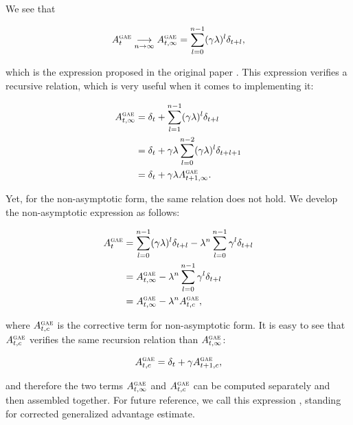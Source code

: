 We see that 

\begin{equation}
	A^{\textsc{gae}}_t \underset{n \rightarrow \infty}{\longrightarrow} A^{\textsc{gae}}_{t, \infty} = \sum_{l=0}^{n-1} (\gamma \lambda)^l \delta_{t+l},
\end{equation}

which is the expression proposed in the original paper \cite{gae}. This expression verifies a recursive relation, which is very useful when it comes to implementing it:

\begin{equation}
\begin{aligned}
	A^{\textsc{gae}}_{t, \infty} 	&= \delta_t + \sum_{l=1}^{n-1} (\gamma \lambda)^l \delta_{t+l}\\
					&= \delta_t + \gamma \lambda \sum_{l=0}^{n-2} (\gamma \lambda)^l \delta_{t+l+1}\\
					&= \delta_t + \gamma \lambda A^{\textsc{gae}}_{t+1, \infty}.
\end{aligned}
\end{equation}

Yet, for the non-asymptotic form, the same relation does not hold. We develop the non-asymptotic expression as follows:

\begin{equation}
\begin{aligned}
	A^{\textsc{gae}}_t 	&= \sum_{l=0}^{n-1} (\gamma \lambda)^l \delta_{t+l} - \lambda^n \sum_{l=0}^{n-1} \gamma^l \delta_{t+l} \\
				&= A^{\textsc{gae}}_{t,\infty} - \lambda^n \sum_{l=0}^{n-1} \gamma^l \delta_{t+l}\\
				&= A^{\textsc{gae}}_{t,\infty} - \lambda^n A^{\textsc{gae}}_{t,c},
\end{aligned}
\end{equation}

where $A^{\textsc{gae}}_{t,c}$ is the corrective term for non-asymptotic form. It is easy to see that $A^{\textsc{gae}}_{t,c}$ verifies the same recursion relation than $A^{\textsc{gae}}_{t,\infty}$:

\begin{equation}
	A^{\textsc{gae}}_{t,c} 	= \delta_t + \gamma A^{\textsc{gae}}_{t+1,c},
\end{equation}

and therefore the two terms $A^{\textsc{gae}}_{t,\infty}$ and $A^{\textsc{gae}}_{t,c}$ can be computed separately and then assembled together. For future reference, we call this expression \cgae, standing for corrected generalized advantage estimate.


